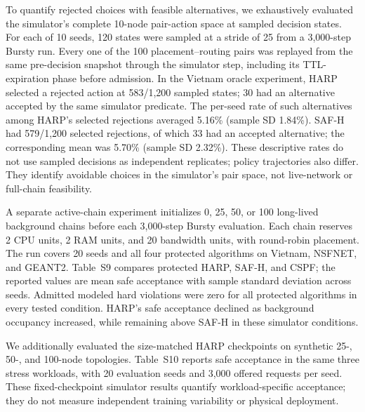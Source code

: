 \documentclass[final,5p]{elsarticle}
\newcommand{\rev}[1]{\textcolor{revisiongreen}{#1}}
\let\newrev\rev
\begin{document}
\newrev{To quantify rejected choices with feasible alternatives, we exhaustively evaluated the simulator's complete 10-node pair-action space at sampled decision states. For each of 10 seeds, 120 states were sampled at a stride of 25 from a 3,000-step Bursty run. Every one of the 100 placement--routing pairs was replayed from the same pre-decision snapshot through the simulator step, including its TTL-expiration phase before admission. In the Vietnam oracle experiment, HARP selected a rejected action at 583/1,200 sampled states; 30 had an alternative accepted by the same simulator predicate. The per-seed rate of such alternatives among HARP's selected rejections averaged 5.16\% (sample SD 1.84\%). SAF-H had 579/1,200 selected rejections, of which 33 had an accepted alternative; the corresponding mean was 5.70\% (sample SD 2.32\%). These descriptive rates do not use sampled decisions as independent replicates; policy trajectories also differ. They identify avoidable choices in the simulator's pair space, not live-network or full-chain feasibility.}




\newrev{A separate active-chain experiment initializes 0, 25, 50, or 100 long-lived background chains before each 3,000-step Bursty evaluation. Each chain reserves 2 CPU units, 2 RAM units, and 20 bandwidth units, with round-robin placement. The run covers 20 seeds and all four protected algorithms on Vietnam, NSFNET, and GEANT2. Table~S9 compares protected HARP, SAF-H, and CSPF; the reported values are mean safe acceptance with sample standard deviation across seeds. Admitted modeled hard violations were zero for all protected algorithms in every tested condition. HARP's safe acceptance declined as background occupancy increased, while remaining above SAF-H in these simulator conditions.}

{\color{revisiongreen}


}

\newrev{We additionally evaluated the size-matched HARP checkpoints on synthetic 25-, 50-, and 100-node topologies. Table~S10 reports safe acceptance in the same three stress workloads, with 20 evaluation seeds and 3,000 offered requests per seed. These fixed-checkpoint simulator results quantify workload-specific acceptance; they do not measure independent training variability or physical deployment.}
\end{document}
